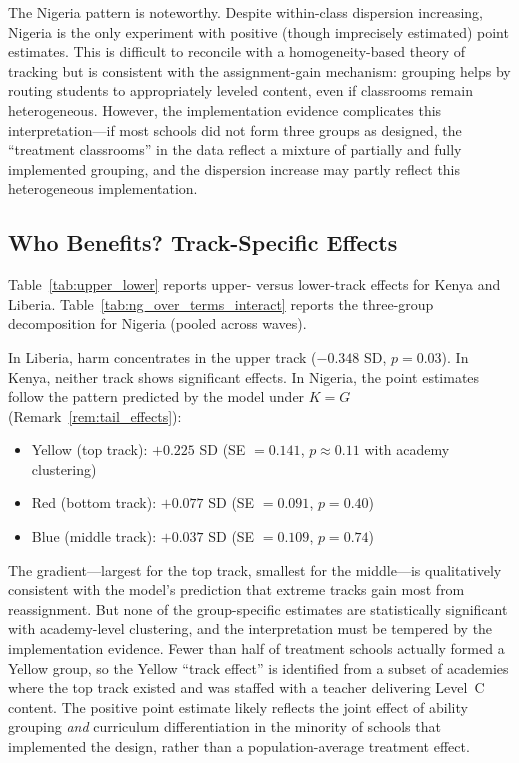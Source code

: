 \documentclass[11pt]{article}
\begin{document}
The Nigeria pattern is noteworthy. Despite within-class dispersion increasing, Nigeria is the only experiment with positive (though imprecisely estimated) point estimates. This is difficult to reconcile with a homogeneity-based theory of tracking but is consistent with the assignment-gain mechanism: grouping helps by routing students to appropriately leveled content, even if classrooms remain heterogeneous. However, the implementation evidence complicates this interpretation---if most schools did not form three groups as designed, the ``treatment classrooms'' in the data reflect a mixture of partially and fully implemented grouping, and the dispersion increase may partly reflect this heterogeneous implementation.

\subsection{Who Benefits? Track-Specific Effects}

Table~\ref{tab:upper_lower} reports upper- versus lower-track effects for Kenya and Liberia. Table~\ref{tab:ng_over_terms_interact} reports the three-group decomposition for Nigeria (pooled across waves).

In Liberia, harm concentrates in the upper track ($-0.348$ SD, $p = 0.03$). In Kenya, neither track shows significant effects. In Nigeria, the point estimates follow the pattern predicted by the model under $K = G$ (Remark~\ref{rem:tail_effects}):
\begin{itemize}
\item Yellow (top track): $+0.225$ SD (SE $= 0.141$, $p \approx 0.11$ with academy clustering)
\item Red (bottom track): $+0.077$ SD (SE $= 0.091$, $p = 0.40$)
\item Blue (middle track): $+0.037$ SD (SE $= 0.109$, $p = 0.74$)
\end{itemize}

The gradient---largest for the top track, smallest for the middle---is qualitatively consistent with the model's prediction that extreme tracks gain most from reassignment. But none of the group-specific estimates are statistically significant with academy-level clustering, and the interpretation must be tempered by the implementation evidence. Fewer than half of treatment schools actually formed a Yellow group, so the Yellow ``track effect'' is identified from a subset of academies where the top track existed and was staffed with a teacher delivering Level~C content. The positive point estimate likely reflects the joint effect of ability grouping \emph{and} curriculum differentiation in the minority of schools that implemented the design, rather than a population-average treatment effect.
\end{document}
